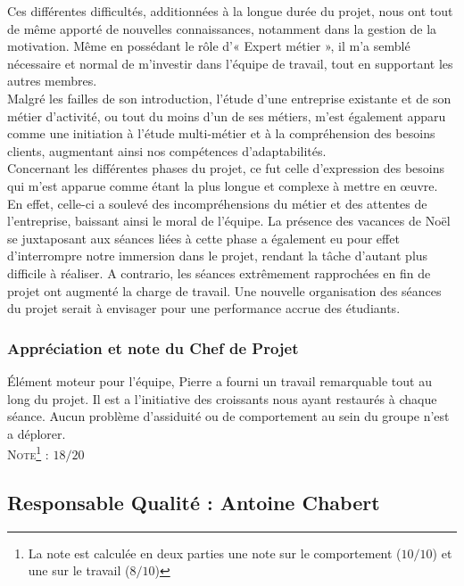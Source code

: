 Ces différentes difficultés, additionnées à la longue durée du projet, nous ont tout de même apporté de nouvelles connaissances, notamment dans la gestion de la motivation. Même en possédant le rôle d’« Expert métier », il m’a semblé nécessaire et normal de m’investir dans l’équipe de travail, tout en supportant les autres membres. \\
 
Malgré les failles de son introduction, l’étude d’une entreprise existante et de son métier d’activité, ou tout du moins d’un de ses métiers, m’est également apparu comme une initiation à l’étude multi-métier et à la compréhension des besoins clients, augmentant ainsi nos compétences d’adaptabilités. \\
 
Concernant les différentes phases du projet, ce fut celle d’expression des besoins qui m’est apparue comme étant la plus longue et complexe à mettre en \oe{}uvre. En effet, celle-ci a soulevé des incompréhensions du métier et des attentes de l’entreprise, baissant ainsi le moral de l’équipe. La présence des vacances de Noël se juxtaposant aux séances liées à cette phase a également eu pour effet d’interrompre notre immersion dans le projet, rendant la tâche d’autant plus difficile à réaliser. A contrario, les séances extrêmement rapprochées en fin de projet ont augmenté la charge de travail. Une nouvelle organisation des séances du projet serait à envisager pour une performance accrue des étudiants. \\

\subsubsection{Appréciation et note du Chef de Projet}

Élément moteur pour l’équipe, Pierre a fourni un travail remarquable tout au long du projet. Il est a l’initiative des croissants nous ayant restaurés à chaque séance.
Aucun problème d’assiduité ou de comportement au sein du groupe n’est a déplorer.\\

\noindent\textsc{Note\footnote{La note est calculée en deux parties une note sur le comportement ($10/10$) et une sur le travail ($8/10$)} :} $18/20$

\subsection{Responsable Qualité : Antoine Chabert}

